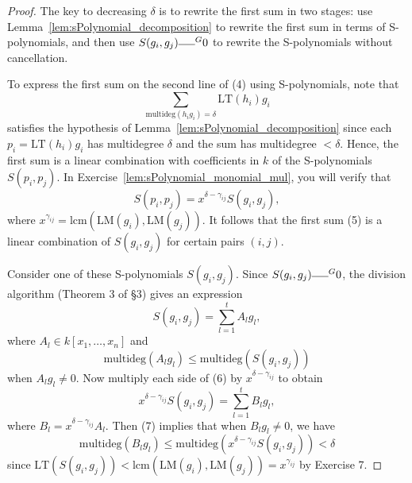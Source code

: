 \begin{proof}
  The key to decreasing $\delta$ is to rewrite the first sum in two stages: use Lemma~\ref{lem:sPolynomial_decomposition} to rewrite the first sum in terms of S-polynomials, and then use $S(g_i, g_j) \overline{\hspace{1.5em}}^G 0$ to rewrite the S-polynomials without cancellation.

  To express the first sum on the second line of (4) using S-polynomials, note that
  \begin{equation} \tag{5}
  \sum_{\text{multideg}(h_i g_i) = \delta} \text{LT}(h_i) g_i
  \end{equation}
  satisfies the hypothesis of Lemma~\ref{lem:sPolynomial_decomposition} since each $p_i = \text{LT}(h_i) g_i$ has multidegree $\delta$ and the sum has multidegree $<\delta$.
  Hence, the first sum is a linear combination with coefficients in $k$ of the S-polynomials $S(p_i, p_j)$.
  In Exercise~\ref{lem:sPolynomial_monomial_mul}, you will verify that
  \[
  S(p_i, p_j) = x^{\delta - \gamma_{ij}} S(g_i, g_j),
  \]
  where $x^{\gamma_{ij}} = \text{lcm}(\text{LM}(g_i), \text{LM}(g_j))$. It follows that the first sum (5) is a linear combination of $S(g_i, g_j)$ for certain pairs $(i, j)$.

  Consider one of these S-polynomials $S(g_i, g_j)$. Since $S(g_i, g_j) \overline{\hspace{1.5em}}^G 0$, the division algorithm (Theorem 3 of §3) gives an expression
  \begin{equation} \tag{6}
  S(g_i, g_j) = \sum_{l=1}^t A_l g_l,
  \end{equation}
  where $A_l \in k[x_1, \dots, x_n]$ and
  \begin{equation} \tag{7}
  \text{multideg}(A_l g_l) \le \text{multideg}(S(g_i, g_j))
  \end{equation}
  when $A_l g_l \ne 0$. Now multiply each side of (6) by $x^{\delta - \gamma_{ij}}$ to obtain
  \begin{equation} \tag{8}
  x^{\delta - \gamma_{ij}} S(g_i, g_j) = \sum_{l=1}^t B_l g_l,
  \end{equation}
  where $B_l = x^{\delta - \gamma_{ij}} A_l$. Then (7) implies that when $B_l g_l \ne 0$, we have
  \begin{equation} \tag{9}
  \text{multideg}(B_l g_l) \le \text{multideg}(x^{\delta - \gamma_{ij}} S(g_i, g_j)) < \delta
  \end{equation}
  since $\text{LT}(S(g_i, g_j)) < \text{lcm}(\text{LM}(g_i), \text{LM}(g_j)) = x^{\gamma_{ij}}$ by Exercise 7.


\end{proof}
